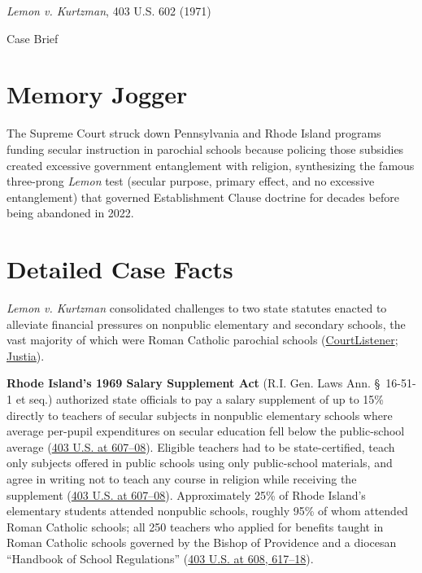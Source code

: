 \documentclass[12pt]{article}
\begin{document}
\begin{center}
{\LARGE \textit{Lemon v. Kurtzman}, 403 U.S. 602 (1971)\par}
\vspace{0.8em}
{\large Case Brief\par}
\end{center}
\vspace{1em}

\section{Memory Jogger}
The Supreme Court struck down Pennsylvania and Rhode Island programs funding secular instruction in parochial schools because policing those subsidies created excessive government entanglement with religion, synthesizing the famous three-prong \textit{Lemon} test (secular purpose, primary effect, and no excessive entanglement) that governed Establishment Clause doctrine for decades before being abandoned in 2022.

\section{Detailed Case Facts}
\textit{Lemon v. Kurtzman} consolidated challenges to two state statutes enacted to alleviate financial pressures on nonpublic elementary and secondary schools, the vast majority of which were Roman Catholic parochial schools (\href{https://www.courtlistener.com/opinion/108380/lemon-v-kurtzman/}{CourtListener}; \href{https://supreme.justia.com/cases/federal/us/403/602/}{Justia}).

\textbf{Rhode Island's 1969 Salary Supplement Act} (R.I. Gen. Laws Ann. \S~16-51-1 et seq.) authorized state officials to pay a salary supplement of up to 15\% directly to teachers of secular subjects in nonpublic elementary schools where average per-pupil expenditures on secular education fell below the public-school average (\href{https://supreme.justia.com/cases/federal/us/403/602/}{403 U.S. at 607--08}). Eligible teachers had to be state-certified, teach only subjects offered in public schools using only public-school materials, and agree in writing not to teach any course in religion while receiving the supplement (\href{https://supreme.justia.com/cases/federal/us/403/602/}{403 U.S. at 607--08}). Approximately 25\% of Rhode Island's elementary students attended nonpublic schools, roughly 95\% of whom attended Roman Catholic schools; all 250 teachers who applied for benefits taught in Roman Catholic schools governed by the Bishop of Providence and a diocesan ``Handbook of School Regulations'' (\href{https://supreme.justia.com/cases/federal/us/403/602/}{403 U.S. at 608, 617--18}).
\end{document}
